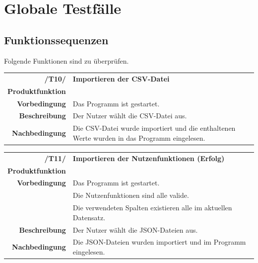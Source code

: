 \documentclass{article}
\begin{document}
\clearpage
\section{Globale Testfälle}

\subsection{Funktionssequenzen}
Folgende Funktionen sind zu überprüfen.

\begin{table}[H]
\begin{tabularx}{\textwidth}{rX}
\vspace{1mm}
\textbf{/T10/}         & \textbf{Importieren der CSV-Datei} \\ \vspace{1mm}
\textbf{Produktfunktion} & \nameref{sec:f:Projekt laden}\\ \vspace{1mm}
\textbf{Vorbedingung}  & Das Programm ist gestartet. \\ \vspace{1mm}
\textbf{Beschreibung}  & Der Nutzer wählt die CSV-Datei aus. \\
\textbf{Nachbedingung} & Die CSV-Datei wurde importiert und die enthaltenen Werte wurden in das Programm eingelesen.
\end{tabularx}
\end{table}

\begin{table}[H]
\begin{tabularx}{\textwidth}{rX}
\vspace{1mm}
\textbf{/T11/}         & \textbf{Importieren der Nutzenfunktionen (Erfolg)} \\ \vspace{1mm}
\textbf{Produktfunktion} & \nameref{sec:f:Alternativen importieren} \\ \vspace{1mm}
\textbf{Vorbedingung}  & Das Programm ist gestartet. \\ & Die Nutzenfunktionen sind alle valide. \\ & Die verwendeten Spalten existieren alle im aktuellen Datensatz. \\
\vspace{1mm}
\textbf{Beschreibung}  & Der Nutzer wählt die JSON-Dateien aus. \\
\textbf{Nachbedingung} & Die JSON-Dateien wurden importiert und im Programm eingelesen.
\end{tabularx}
\end{table}
\end{document}
